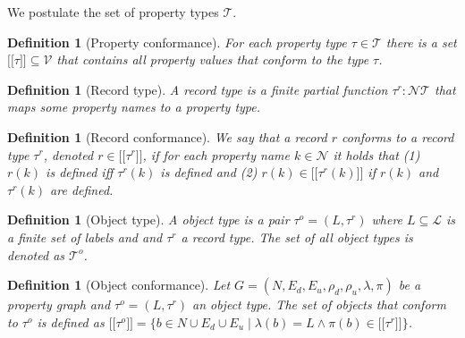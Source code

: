 \documentclass[a4paper]{article}
\makeatletter
\newtheorem{definition}[theorem]{Definition}
\newcommand{\pto}{}%
\DeclareRobustCommand{\pto}{\mathrel{\mathpalette\p@to@gets\to}}
\newcommand{\p@to@gets}[2]{%
  \ooalign{\hidewidth$\m@th#1\mapstochar\mkern5mu$\hidewidth\cr$\m@th#1\to$\cr}%
}
\newcommand{\ptype}{\tau}
\newcommand{\ptypes}{\mathcal{T}}
\newcommand{\rtype}{\tau^r}
\newcommand{\otype}{\tau^o}
\newcommand{\otypes}{\mathcal{T}^o}
\newcommand{\lsem}{\ensuremath{[\![}}
\newcommand{\rsem}{\ensuremath{]\!]}}
\newcommand{\sem}[1]{\ensuremath{\lsem #1 \rsem}}
\makeatother
\begin{document}
We postulate the set of property types $\mathcal{T}$.

\begin{definition}[Property conformance]
  For each property type $\ptype \in \ptypes$ there is a set $\sem{\ptype} \subseteq \mathcal{V}$ that contains all property values that \emph{conform} to the type $\ptype$.
\end{definition}

\begin{definition}[Record type]
  A \emph{record type} is a finite partial function $\rtype : \mathcal{N} \pto \ptypes$ that maps some property names to a property type.
\end{definition}

\begin{definition}[Record conformance]
  We say that a record $r$ \emph{conforms} to a record type $\rtype$, denoted $r \in \sem{\rtype}$, if for each property name $k \in \mathcal{N}$ it holds that (1) $r(k)$ is defined iff $\rtype(k)$ is defined and (2) $r(k) \in \sem{\rtype(k)}$ if $r(k)$ and $\rtype(k)$ are defined.
\end{definition}

\begin{definition}[Object type]
  A \emph{object type} is a pair $\otype = (L, \rtype)$ where $L \subseteq \mathcal{L}$ is a finite set of labels and and $\rtype$ a record type. 
  The set of all object types is denoted as $\otypes$.
\end{definition}

\begin{definition}[Object conformance]
  Let $G = (N, E_d, E_u, \rho_d, \rho_u, \lambda, \pi)$ be a property graph and $\otype = (L, \rtype)$ an object type. The set of objects that \emph{conform} to $\otype$ is defined as $\sem{\otype} = \{b \in N \cup E_d \cup E_u \mid \lambda(b) = L \wedge \pi(b) \in \sem{\rtype}\}$.
\end{definition}
\end{document}

